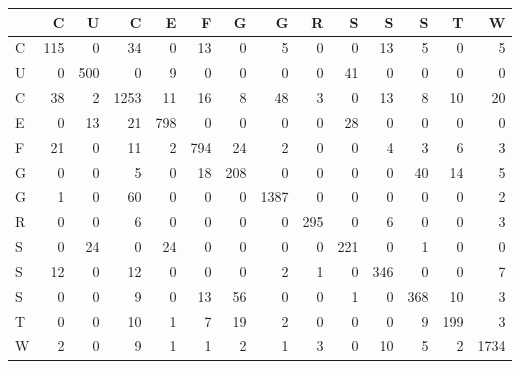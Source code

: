 \begin{tabular}{lrrrrrrrrrrrrr}
\toprule
{} &    C &    U &     C &    E &    F &    G &     G &    R &    S &    S &    S &    T &     W \\
\midrule
C &  115 &    0 &    34 &    0 &   13 &    0 &     5 &    0 &    0 &   13 &    5 &    0 &     5 \\
U &    0 &  500 &     0 &    9 &    0 &    0 &     0 &    0 &   41 &    0 &    0 &    0 &     0 \\
C &   38 &    2 &  1253 &   11 &   16 &    8 &    48 &    3 &    0 &   13 &    8 &   10 &    20 \\
E &    0 &   13 &    21 &  798 &    0 &    0 &     0 &    0 &   28 &    0 &    0 &    0 &     0 \\
F &   21 &    0 &    11 &    2 &  794 &   24 &     2 &    0 &    0 &    4 &    3 &    6 &     3 \\
G &    0 &    0 &     5 &    0 &   18 &  208 &     0 &    0 &    0 &    0 &   40 &   14 &     5 \\
G &    1 &    0 &    60 &    0 &    0 &    0 &  1387 &    0 &    0 &    0 &    0 &    0 &     2 \\
R &    0 &    0 &     6 &    0 &    0 &    0 &     0 &  295 &    0 &    6 &    0 &    0 &     3 \\
S &    0 &   24 &     0 &   24 &    0 &    0 &     0 &    0 &  221 &    0 &    1 &    0 &     0 \\
S &   12 &    0 &    12 &    0 &    0 &    0 &     2 &    1 &    0 &  346 &    0 &    0 &     7 \\
S &    0 &    0 &     9 &    0 &   13 &   56 &     0 &    0 &    1 &    0 &  368 &   10 &     3 \\
T &    0 &    0 &    10 &    1 &    7 &   19 &     2 &    0 &    0 &    0 &    9 &  199 &     3 \\
W &    2 &    0 &     9 &    1 &    1 &    2 &     1 &    3 &    0 &   10 &    5 &    2 &  1734 \\
\bottomrule
\end{tabular}
